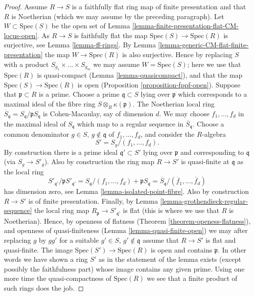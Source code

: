 \begin{proof}
\medskip\noindent
Assume $R \to S$ is a faithfully flat ring map of finite presentation
and that $R$ is Noetherian (which we may assume by the preceding
paragraph). Let $W \subset \text{Spec}(S)$ be the open set of
Lemma \ref{lemma-finite-presentation-flat-CM-locus-open}.
As $R \to S$ is faithfully flat the map $\text{Spec}(S) \to \text{Spec}(R)$
is surjective, see Lemma \ref{lemma-ff-rings}.
By Lemma \ref{lemma-generic-CM-flat-finite-presentation}
the map $W \to \text{Spec}(R)$ is also surjective.
Hence by replacing $S$ with a product $S_{g_1} \times \ldots \times S_{g_m}$
we may assume $W = \text{Spec}(S)$; here we use that $\text{Spec}(R)$
is quasi-compact (Lemma \ref{lemma-quasicompact}), and that the map
$\text{Spec}(S) \to \text{Spec}(R)$ is open
(Proposition \ref{proposition-fppf-open}).
Suppose that $\mathfrak p \subset R$ is a prime. Choose a prime
$\mathfrak q \subset S$ lying over $\mathfrak p$ which corresponds
to a maximal ideal of the fibre ring $S \otimes_R \kappa(\mathfrak p)$.
The Noetherian local ring
$\overline{S}_{\mathfrak q} = S_{\mathfrak q}/\mathfrak pS_{\mathfrak q}$
is Cohen-Macaulay, say of dimension $d$. We may choose $f_1, \ldots, f_d$
in the maximal ideal of $S_{\mathfrak q}$ which map to a regular sequence
in $\overline{S}_{\mathfrak q}$. Choose a common denominator
$g \in S$, $g \not \in \mathfrak q$ of $f_1, \ldots, f_d$, and consider
the $R$-algebra
$$
S' = S_g/(f_1, \ldots, f_d).
$$
By construction there is a prime ideal $\mathfrak q' \subset S'$
lying over $\mathfrak p$ and corresponding to $\mathfrak q$ (via
$S_g \to S'_g$). Also by construction the ring map $R \to S'$ is
quasi-finite at $\mathfrak q$ as the local ring
$$
S'_{\mathfrak q'}/\mathfrak pS'_{\mathfrak q'} =
S_{\mathfrak q}/(f_1, \ldots, f_d) + \mathfrak pS_{\mathfrak q} =
\overline{S}_{\mathfrak q}/(\overline{f}_1, \ldots, \overline{f}_d)
$$
has dimension zero, see Lemma \ref{lemma-isolated-point-fibre}.
Also by construction $R \to S'$ is of finite presentation.
Finally, by Lemma \ref{lemma-grothendieck-regular-sequence} the local ring map
$R_{\mathfrak p} \to S'_{\mathfrak q'}$ is flat (this is where we
use that $R$ is Noetherian). Hence, by openness of flatness
(Theorem \ref{theorem-openess-flatness}), and openness of quasi-finiteness
(Lemma \ref{lemma-quasi-finite-open})
we may after replacing
$g$ by $gg'$ for a suitable $g' \in S$, $g' \not \in \mathfrak q$
assume that $R \to S'$ is flat and quasi-finite.
The image $\text{Spec}(S') \to \text{Spec}(R)$ is open and
contains $\mathfrak p$. In other words we have shown
a ring $S'$ as in the statement of the lemma exists (except possibly
the faithfulness part) whose image contains any given prime.
Using one more time the quasi-compactness of $\text{Spec}(R)$
we see that a finite product of such rings does the job.
\end{proof}















